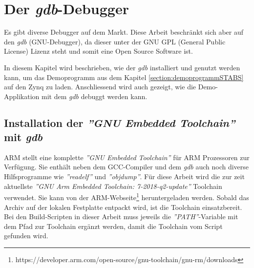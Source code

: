 \chapter{Der \textit{gdb}-Debugger}
\label{chapter:Der-gdb-Debugger}
Es gibt diverse Debugger auf dem Markt.
Diese Arbeit beschränkt sich aber auf den  \textit{gdb} (GNU-Debugger), da dieser unter der GNU GPL (General Public License) Lizenz steht und somit eine Open Source Software ist.

In diesem Kapitel wird beschrieben, wie der \textit{gdb} installiert und genutzt werden kann, um das Demoprogramm aus dem Kapitel \ref{section:demoprogrammSTABS} auf den Zynq zu laden.
Anschliessend wird auch gezeigt, wie die Demo-Applikation mit dem \textit{gdb} debuggt werden kann.


\section{Installation der \textit{''GNU Embedded Toolchain''} mit \textit{gdb}}
\label{section:installationGDB}
ARM stellt eine komplette \textit{''GNU Embedded Toolchain''} für ARM Prozessoren zur Verfügung.
Sie enthält neben dem GCC-Compiler und dem \textit{gdb} auch noch diverse Hilfsprogramme wie \textit{''readelf''} und \textit{''objdump''}.
Für diese Arbeit wird die zur zeit aktuellste \textit{''GNU Arm Embedded Toolchain: 7-2018-q2-update''} Toolchain verwendet.
Sie kann von der ARM-Webseite\footnote{https://developer.arm.com/open-source/gnu-toolchain/gnu-rm/downloads} heruntergeladen werden.
Sobald das Archiv auf der lokalen Festplatte entpackt wird, ist die Toolchain einsatzbereit.
Bei den Build-Scripten in dieser Arbeit muss jeweils die \textit{''PATH''}-Variable mit dem Pfad zur Toolchain ergänzt werden, damit die Toolchain vom Script gefunden wird.


